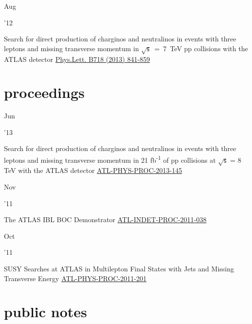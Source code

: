 \documentclass[]{cv} %
\begin{document}
\begin{entrylist}
    \entry
    {\parbox[t]{\parboxWidthOne}{Aug}\parbox[t]{\parboxWidthTwo}{\hfill '12}}
    {Search for direct production of charginos and neutralinos in events with three leptons and missing transverse momentum in $\sqrt{\mathsf{s}}$~=~7~TeV pp collisions with the ATLAS detector}
  {\href{https://www.sciencedirect.com/science/article/pii/S037026931201204X?via\%3Dihub}{Phys.Lett. B718 (2013) 841-859}}
  {\vspace*{\spacingPubs}}

\end{entrylist}

\section{proceedings}

\begin{entrylist}

\entry
{\parbox[t]{\parboxWidthOne}{Jun}\parbox[t]{\parboxWidthTwo}{\hfill '13}}
{Search for direct production of charginos and neutralinos in events with three leptons and missing transverse momentum in 21
  fb\textsuperscript{-1} of pp collisions at $\sqrt{\mathsf{s}}$ = 8 TeV with the ATLAS detector}
  {\href{https://cds.cern.ch/record/1554811}{ATL-PHYS-PROC-2013-145}}
  {\vspace*{\spacingPubs}}

  \entry
  {\parbox[t]{\parboxWidthOne}{Nov}\parbox[t]{\parboxWidthTwo}{\hfill '11}}
  {The ATLAS IBL BOC Demonstrator}
  {\href{https://cds.cern.ch/record/1401224}{ATL-INDET-PROC-2011-038}}
  {\vspace*{\spacingPubs}}

  \entry
  {\parbox[t]{\parboxWidthOne}{Oct}\parbox[t]{\parboxWidthTwo}{\hfill '11}}
  {SUSY Searches at ATLAS in Multilepton Final States with Jets and Missing Transverse Energy}
  {\href{https://cds.cern.ch/record/1394331}{ATL-PHYS-PROC-2011-201}}
  {\vspace*{\spacingPubs}}

\end{entrylist}

\section{public notes}
\end{document}

